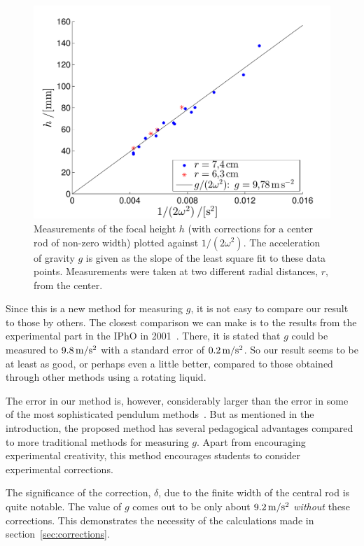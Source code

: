 \documentclass[11pt, a4paper, twocolumn, swedish, english]{article}
\begin{document}
\begin{figure}\centering 
\includegraphics[width=.8\linewidth]{g_minsta_kvadrat.pdf}
\caption{\label{fig:data} Measurements of the focal height $h$ (with
  corrections for a center rod of non-zero width) plotted against
  $1/(2\omega^2)$. The acceleration of gravity $g$ is given as the
  slope of the least square fit to these data points. Measurements
  were taken at two different radial distances, $r$, from the center.
}
\end{figure}

Since this is a new method for measuring $g$, it is not
easy to compare our result to those by others. The closest
comparison we can make is to the results from the experimental part in 
the IPhO in 2001~\cite{IPhO2001}. There, it is stated that $g$ could be measured to $\unit[9.8]{m/s^2}$ with a standard error of $\unit[0.2]{m/s^2}$. So our result seems to be at least as good, or perhaps even a little better, compared to those obtained through other methods using a rotating liquid. 

The error in our method is, however, considerably larger than
the error in some of the most sophisticated pendulum methods~\cite{Candela2001}. 
But as mentioned in the introduction, the proposed method has several pedagogical advantages
compared to more traditional methods for measuring $g$. Apart from encouraging
experimental creativity, this method encourages students to consider experimental corrections. 

The significance of the correction, $\delta$, due to the finite width of the central
rod is quite notable. The value of $g$ comes out to be only
about $\unit[9.2]{m/s^2}$ \emph{without} these corrections. This
demonstrates the necessity of the calculations made in
section~\ref{sec:corrections}. 
\end{document}
